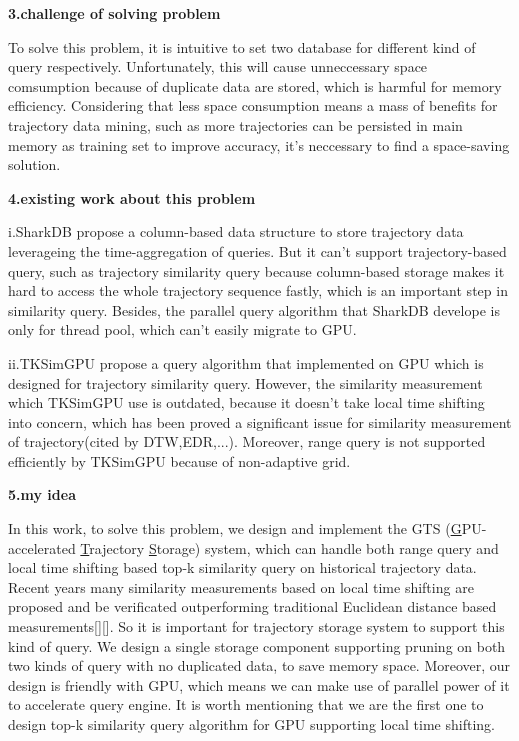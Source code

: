 \documentclass[conference]{IEEEtran}
\begin{document}
\textbf{3.challenge of solving problem}

	To solve this problem, it is intuitive to set two database for different kind of query respectively. Unfortunately, this will cause unneccessary space comsumption because of duplicate data are stored, which is harmful for memory efficiency. Considering that less space consumption means a mass of benefits for trajectory data mining, such as more trajectories can be persisted in main memory as training set to improve accuracy, it's neccessary to find a space-saving solution.
	
\textbf{4.existing work about this problem}
	
	i.SharkDB propose a column-based data structure to store trajectory data leverageing the time-aggregation of queries. But it can't support trajectory-based query, such as trajectory similarity query because column-based storage makes it hard to access the whole trajectory sequence fastly, which is an important step in similarity query. Besides, the parallel query algorithm that SharkDB develope is only for thread pool, which can't easily migrate to GPU.
	
	ii.TKSimGPU propose a query algorithm that implemented on GPU which is designed for trajectory similarity query. However, the similarity measurement which TKSimGPU use is outdated, because it doesn't take local time shifting into concern, which has been proved a significant issue for similarity measurement of trajectory(cited by DTW,EDR,...). Moreover, range query is not supported efficiently by TKSimGPU because of non-adaptive grid.
	
\textbf{5.my idea}
	
	In this work, to solve this problem, we design and implement the GTS (\underline{G}PU-accelerated \underline{T}rajectory \underline{S}torage) system, which can handle both range query and local time shifting based top-k similarity query on historical trajectory data. Recent years many similarity measurements based on local time shifting are proposed and be verificated outperforming traditional Euclidean distance based measurements[][]. So it is important for trajectory storage system to support this kind of query. We design a single storage component supporting pruning on both two kinds of query with no duplicated data, to save memory space. Moreover, our design is friendly with GPU, which means we can make use of parallel power of it to accelerate query engine. It is worth mentioning that we are the first one to design top-k similarity query algorithm for GPU supporting local time shifting. 
	
\end{document}
